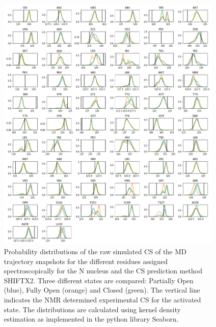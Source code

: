 \documentclass[%
 aip,
 amsmath,amssymb,
 preprint,%
]{revtex4-1}
\begin{document}
\begin{figure}[tbp]
	\includegraphics[width=\textwidth]{figures_SI/hist_sparta_plus_N.png}
	 \caption{\scriptsize
 Probability distributions of the raw simulated CS of the MD trajectory snapshots for the different residues assigned spectroscopically for the N nucleus and the CS prediction method SHIFTX2. Three different states are compared: Partially Open (blue), Fully Open (orange) and Closed (green). The vertical line indicates the NMR determined experimental CS for the activated state. The distributions are calculated using kernel density estimation as implemented in the python library Seaborn. 
}
\label{SI_hist8}
\end{figure}
\end{document}
